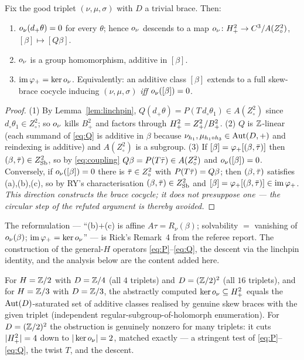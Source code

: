 \begin{theorem}[$\onu$ is a homomorphism and $\im\varphi_+=\ker\onu$, \textsc{[proved]}]
\label{thm:onu}
Fix the good triplet $(\nu,\mu,\sigma)$ with $D$ a trivial brace. Then:
\begin{enumerate}
\item[\rm(1)] $o_\nu(d_+\theta)=0$ for every $\theta$; hence $\onu$ descends to a map
   $o_\nu\colon H^2_+\to C^3/A(Z^2_\circ)$, $[\beta]\mapsto[Q\beta]$.
\item[\rm(2)] $\onu$ is a group homomorphism, additive in $[\beta]$.
\item[\rm(3)] $\im\varphi_+=\ker\onu$. Equivalently: an additive class $[\beta]$
   extends to a full skew-brace cocycle inducing $(\nu,\mu,\sigma)$ \emph{iff}
   $o_\nu([\beta])=0$.
\end{enumerate}
\end{theorem}

\begin{proof}
(1) By Lemma~\ref{lem:linchpin}, $Q(d_+\theta)=P(T\,d_\circ\theta_1)\in A(Z^2_\circ)$
since $d_\circ\theta_1\in Z^2_\circ$; so $\onu$ kills $B^2_+$ and factors through
$H^2_+=Z^2_+/B^2_+$. (2) $Q$ is $\mathbb{Z}$-linear (each summand of \eqref{eq:Q} is
additive in $\beta$ because $\nu_{h_1},\mu_{h_1\circ h_3}\in\mathrm{Aut}(D,+)$ and
reindexing is additive) and $A(Z^2_\circ)$ is a subgroup. (3) If
$[\beta]=\varphi_+[(\beta,\bar\tau)]$ then $(\beta,\bar\tau)\in Z^2_{\mathrm{Sb}}$, so by
\eqref{eq:coupling} $Q\beta=P(T\bar\tau)\in A(Z^2_\circ)$ and $o_\nu([\beta])=0$.
Conversely, if $o_\nu([\beta])=0$ there is $\bar\tau\in Z^2_\circ$ with
$P(T\bar\tau)=Q\beta$; then $(\beta,\bar\tau)$ satisfies (a),(b),(c), so by RY's
characterisation $(\beta,\bar\tau)\in Z^2_{\mathrm{Sb}}$ and
$[\beta]=\varphi_+[(\beta,\bar\tau)]\in\operatorname{im}\varphi_+$. \emph{This direction constructs
the brace cocycle; it does not presuppose one --- the circular step of the refuted
argument is thereby avoided.}
\end{proof}

The reformulation --- ``(b)$+$(c) is affine $A\tau=R_\nu(\beta)$; solvability $=$
vanishing of $o_\nu(\beta)$; $\im\varphi_+=\ker\onu$'' --- is Rick's Remark~4 from
the referee report. The construction of the general-$H$ operators
\eqref{eq:P}--\eqref{eq:Q}, the descent via the linchpin identity, and the analysis
below are the content added here.

\begin{proposition}\label{prop:cross}
For $H=\mathbb{Z}/2$ with $D=\mathbb{Z}/4$ (all $4$ triplets) and $D=(\mathbb{Z}/2)^2$ (all $16$ triplets),
and for $H=\mathbb{Z}/3$ with $D=\mathbb{Z}/3$, the abstractly computed $\operatorname{ker}o_\nu\subseteq H^2_+$
equals the $\mathrm{Aut}(D)$-saturated set of additive classes realised by genuine skew
braces with the given triplet (independent regular-subgroup-of-holomorph
enumeration). For $D=(\mathbb{Z}/2)^2$ the obstruction is genuinely nonzero for many
triplets: it cuts $|H^2_+|=4$ down to $|\operatorname{ker}o_\nu|=2$, matched exactly --- a
stringent test of \eqref{eq:P}--\eqref{eq:Q}, the twist $T$, and the descent.
\end{proposition}

